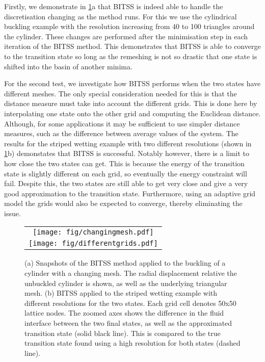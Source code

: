 \documentclass[aps,twocolumn]{revtex4-1}
\begin{document}
\topic Firstly, we demonstrate in \cref{fig:adaptivemesh}a that BITSS is indeed able to handle the discretisation changing as the method runs.
For this we use the cylindrical buckling example with the resolution increasing from 40 to 100 triangles around the cylinder.
These changes are performed after the minimisation step in each iteration of the BITSS method.
This demonstrates that BITSS is able to converge to the transition state so long as the remeshing is not so drastic that one state is shifted into the basin of another minima.

\topic For the second test, we investigate how BITSS performs when the two states have different meshes.
The only special consideration needed for this is that the distance measure must take into account the different grids.
This is done here by interpolating one state onto the other grid and computing the Euclidean distance.
Although, for some applications it may be sufficient to use simpler distance measures, such as the difference between average values of the system.
The results for the striped wetting example with two different resolutions (shown in \cref{fig:adaptivemesh}b) demonstates that BITSS is successful.
Notably however, there is a limit to how close the two states can get.
This is because the energy of the transition state is slightly different on each grid, so eventually the energy constraint will fail.
Despite this, the two states are still able to get very close and give a very good approximation to the transition state.
Furthermore, using an adaptive grid model the grids would also be expected to converge, thereby eliminating the issue.

\begin{figure}[tb]
  \centering
  \begin{tabular}[b]{c}
    \texttt{[image: fig/changingmesh.pdf]}\\
    \texttt{[image: fig/differentgrids.pdf]}%
  \end{tabular}
  \caption{
    (a) Snapshots of the BITSS method applied to the buckling of a cylinder with a changing mesh.
        The radial displacement relative the unbuckled cylinder is shown, as well as the underlying triangular mesh.
    (b) BITSS applied to the striped wetting example with different resolutions for the two states.
        Each grid cell denotes 50x50 lattice nodes.
        The zoomed axes shows the difference in the fluid interface between the two final states, as well as the approximated transition state (solid black line).
        This is compared to the true transition state found using a high resolution for both states (dashed line).
  }
  \label{fig:adaptivemesh}
\end{figure}
\end{document}
